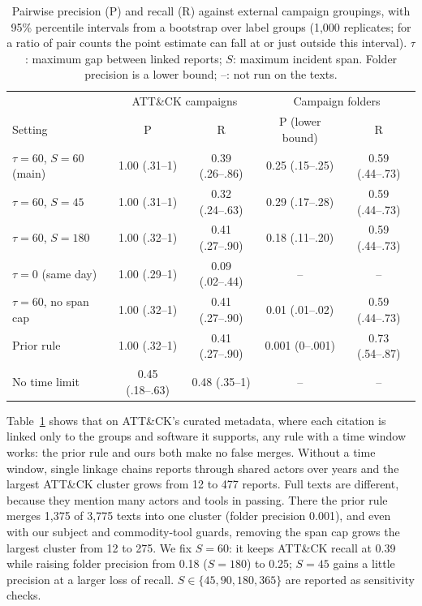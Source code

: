 \documentclass[runningheads]{llncs}
\newcommand{\attack}{ATT\&CK}
\begin{document}
\begin{table}[t]
\caption{Pairwise precision (P) and recall (R) against external campaign groupings, with 95\% percentile intervals from a bootstrap over label groups (1,000 replicates; for a ratio of pair counts the point estimate can fall at or just outside this interval). $\tau$: maximum gap between linked reports; $S$: maximum incident span. Folder precision is a lower bound; --: not run on the texts.}\label{tab:val}
\centering\footnotesize
\setlength\tabcolsep{3pt}\begin{tabular}{@{}lcccc@{}}
\toprule
 & \multicolumn{2}{c}{\attack{} campaigns} & \multicolumn{2}{c}{Campaign folders} \\
Setting & P & R & P (lower bound) & R \\
\midrule
$\tau = 60$, $S = 60$ (main) & 1.00 (.31--1) & 0.39 (.26--.86) & 0.25 (.15--.25) & 0.59 (.44--.73) \\
$\tau = 60$, $S = 45$ & 1.00 (.31--1) & 0.32 (.24--.63) & 0.29 (.17--.28) & 0.59 (.44--.73) \\
$\tau = 60$, $S = 180$ & 1.00 (.32--1) & 0.41 (.27--.90) & 0.18 (.11--.20) & 0.59 (.44--.73) \\
$\tau = 0$ (same day) & 1.00 (.29--1) & 0.09 (.02--.44) & -- & -- \\
$\tau = 60$, no span cap & 1.00 (.32--1) & 0.41 (.27--.90) & 0.01 (.01--.02) & 0.59 (.44--.73) \\
Prior rule~\cite{rahman2024arsenal} & 1.00 (.32--1) & 0.41 (.27--.90) & 0.001 (0--.001) & 0.73 (.54--.87) \\
No time limit & 0.45 (.18--.63) & 0.48 (.35--1) & -- & -- \\
\bottomrule
\end{tabular}
\end{table}

Table~\ref{tab:val} shows that on \attack{}'s curated metadata, where each citation is linked only to the groups and software it supports, any rule with a time window works: the prior rule and ours both make no false merges. Without a time window, single linkage chains reports through shared actors over years and the largest \attack{} cluster grows from 12 to 477 reports. Full texts are different, because they mention many actors and tools in passing. There the prior rule merges 1,375 of 3,775 texts into one cluster (folder precision 0.001), and even with our subject and commodity-tool guards, removing the span cap grows the largest cluster from 12 to 275. We fix $S = 60$: it keeps \attack{} recall at 0.39 while raising folder precision from 0.18 ($S = 180$) to 0.25; $S = 45$ gains a little precision at a larger loss of recall. $S \in \{45, 90, 180, 365\}$ are reported as sensitivity checks.
\end{document}
